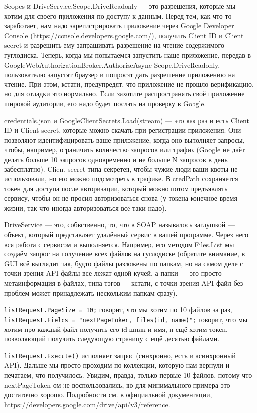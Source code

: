 \documentclass{../../text-style}
\begin{document}
Scopes и DriveService.Scope.DriveReadonly --- это разрешения, которые мы хотим для своего приложения по доступу к данным. Перед тем, как что-то заработает, нам надо зарегистрировать приложение через Google Developer Console (\url{https://console.developers.google.com/}), получить Client ID и Client secret и разрешить ему запрашивать разрешение на чтение содержимого гуглодиска. Теперь, когда мы попытаемся запустить наше приложение, передав в GoogleWebAuthorizationBroker.AuthorizeAsync Scope.DriveReadonly, пользователю запустят браузер и попросят дать разрешение приложению на чтение. При этом, кстати, предупредят, что приложение не прошло верификацию, но для отладки это нормально. Если захотите распространять своё приложение широкой аудитории, его надо будет послать на проверку в Google.

credentials.json и GoogleClientSecrets.Load(stream) --- это как раз и есть Client ID и Client secret, которые можно скачать при регистрации приложения. Они позволяют идентифицировать ваше приложение, когда оно выполняет запросы, чтобы, например, ограничить количество запросов или трафик (Google не даёт делать больше 10 запросов одновременно и не больше N запросов в день забесплатно). Client secret типа секретен, чтобы чужие люди ваши квоты не использовали, но его можно подсмотреть в трафике. В credPath сохраняется токен для доступа после авторизации, который можно потом предъявлять сервису, чтобы он не просил авторизоваться снова (у токена конечное время жизни, так что иногда авторизоваться всё-таки надо).

DriveService --- это, собвственно, то, что в SOAP называлось заглушкой --- объект, который представляет удалённый сервис в вашей программе. Через него вся работа с сервисом и выполняется. Например, его методом Files.List мы создаём запрос на получение всех файлов на гуглодиске (обратите внимание, в GUI всё выглядит так, будто файлы разложены по папкам, но на самом деле с точки зрения API файлы все лежат одной кучей, а папки --- это просто метаинформация в файлах, типа тэгов --- кстати, с точки зрения API файл без проблем может принадлежать нескольким папкам сразу).

\texttt{listRequest.PageSize = 10;} говорит, что мы хотим по 10 файлов за раз, \texttt{listRequest.Fields = "nextPageToken, files(id, name)";} говорит, что мы хотим про каждый файл получить его id-шник и имя, и ещё хотим токен, позволяющий получить следующую страницу с ещё десятью файлами.

\texttt{listRequest.Execute()} исполняет запрос (синхронно, есть и асинхронный API). Дальше мы просто проходим по коллекции, которую нам вернули и печатаем, что получилось. Увидим, правда, только первые 10 файлов, потому что nextPageToken-ом не воспользовались, но для минимального примера это достаточно хорошо. Подробности см. в официальной документации, \url{https://developers.google.com/drive/api/v3/reference}.
\end{document}
